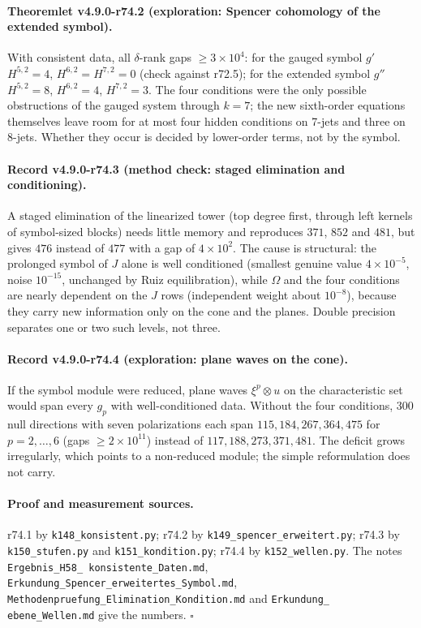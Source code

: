 \paragraph{Theoremlet v4.9.0-r74.2 (exploration: Spencer cohomology of the extended symbol).}
With consistent data, all \(\delta\)-rank gaps \(\ge3\times10^4\): for the gauged symbol \(g'\)
\(H^{5,2}=4\), \(H^{6,2}=H^{7,2}=0\) (check against r72.5); for the extended symbol \(g''\) \(H^{5,2}=8\), \(H^{6,2}=4\),
\(H^{7,2}=3\).  The four conditions were the only possible obstructions of the gauged system through \(k=7\); the new
sixth-order equations themselves leave room for at most four hidden conditions on 7-jets and three on 8-jets.  Whether they
occur is decided by lower-order terms, not by the symbol.

\paragraph{Record v4.9.0-r74.3 (method check: staged elimination and conditioning).}
A staged elimination of the linearized tower (top degree first, through left kernels of symbol-sized blocks) needs little
memory and reproduces \(371\), \(852\) and \(481\), but gives \(476\) instead of \(477\) with a gap of \(4\times10^2\).  The cause
is structural: the prolonged symbol of \(J\) alone is well conditioned (smallest genuine value \(4\times10^{-5}\), noise
\(10^{-15}\), unchanged by Ruiz equilibration), while \(\Omega\) and the four conditions are nearly dependent on the \(J\) rows
(independent weight about \(10^{-8}\)), because they carry new information only on the cone and the planes.  Double
precision separates one or two such levels, not three.

\paragraph{Record v4.9.0-r74.4 (exploration: plane waves on the cone).}
If the symbol module were reduced, plane waves \(\xi^p\otimes u\) on the characteristic set would span every \(g_p\) with
well-conditioned data.  Without the four conditions, 300 null directions with seven polarizations each span
\(115,184,267,364,475\) for \(p=2,\dots,6\) (gaps \(\ge2\times10^{11}\)) instead of \(117,188,273,371,481\).  The deficit grows
irregularly, which points to a non-reduced module; the simple reformulation does not carry.

\paragraph{Proof and measurement sources.}
r74.1 by \texttt{k148\_konsistent.py}; r74.2 by \texttt{k149\_spencer\_erweitert.py}; r74.3 by \texttt{k150\_stufen.py} and
\texttt{k151\_kondition.py}; r74.4 by \texttt{k152\_wellen.py}.  The notes \texttt{Ergebnis\_H58\_\allowbreak
konsistente\_\allowbreak Daten.md}, \texttt{Erkundung\_\allowbreak Spencer\_\allowbreak erweitertes\_\allowbreak Symbol.md},
\texttt{Methodenpruefung\_\allowbreak Elimination\_\allowbreak Kondition.md} and \texttt{Erkundung\_\allowbreak
ebene\_\allowbreak Wellen.md} give the numbers.  \(\square\)

